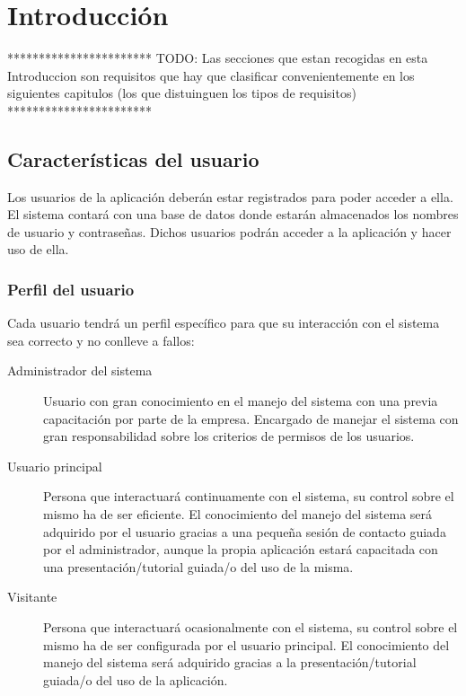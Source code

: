 \chapter{Introducción}

    ***********************\newline
    TODO: Las secciones que estan recogidas en esta Introduccion son requisitos que hay que clasificar convenientemente en los siguientes capitulos (los que distuinguen los tipos de requisitos)
    ***********************\newline

\section{Características del usuario}
    Los usuarios de la aplicación deberán estar registrados para poder acceder a ella. El sistema contará con una base de datos donde estarán almacenados los nombres de usuario y contrase\~nas. Dichos usuarios podrán acceder a la aplicación y hacer uso de ella.

    \subsection{Perfil del usuario}
        Cada usuario tendrá un perfil específico para que su interacción con el sistema sea correcto y no conlleve a fallos:
        \begin{description}
            \item[Administrador del sistema] Usuario con gran conocimiento en el manejo del sistema con una previa capacitación por parte de la empresa. Encargado de manejar el sistema con gran responsabilidad sobre los criterios de permisos de los usuarios.

            \item[Usuario principal] Persona que interactuará continuamente con el sistema, su control sobre el mismo ha de ser eficiente. El conocimiento del manejo del sistema será adquirido por el usuario gracias a una peque\~na sesión de contacto guiada por el administrador, aunque la propia aplicación estará capacitada con una presentación/tutorial guiada/o del uso de la misma.

            \item[Visitante] Persona que interactuará ocasionalmente con el sistema, su control sobre el mismo ha de ser configurada por el usuario principal. El conocimiento del manejo del sistema será adquirido gracias a la presentación/tutorial guiada/o del uso de la aplicación.
        \end{description}

